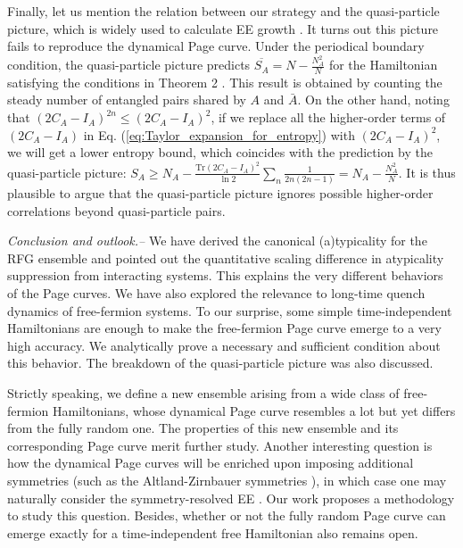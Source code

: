 \documentclass[twocolumn,english,prl,aps,superscriptaddress,amsmath,amssymb,floatfix]{revtex4-2}
\begin{document}
Finally, let us mention the relation between our strategy
and the quasi-particle picture, which is widely 
used to calculate EE 
growth \citep{PhysRevLett.127.060404,Jurcevic2014,Castro2016_,Essler2016,Calabrese2005,Fagotti2008,Bertini2018,BertiniB2018_2}. 
It turns out this picture fails to 
reproduce the 
dynamical Page curve. Under the 
periodical boundary condition, the quasi-particle
picture predicts 
$\overline{S_{A}}=N-\frac{N_{A}^{2}}{N}$
for the Hamiltonian satisfying the conditions in Theorem 2 \cite{SM}. This result is obtained by counting the steady number of entangled pairs shared by $A$ and $\bar A$. 
On the other hand, noting that $(2C_{A}-I_{A})^{2n}\leq(2C_{A}-I_{A})^{2}$,
if we replace all the higher-order terms of $(2C_{A}-I_{A})$ in Eq. (\ref{eq:Taylor_expansion_for_entropy})
with $(2C_{A}-I_{A})^{2}$, we will get a lower entropy 
bound, which coincides with the prediction 
by the quasi-particle picture: $S_{A}\geq N_{A}-\frac{\mathrm{Tr}(2C_{A}-I_{A})^{2}}{\ln2}\sum_{n}\frac{1}{2n(2n-1)}=N_{A}-\frac{N_{A}^{2}}{N}$.
It is thus plausible 
to argue that the quasi-particle picture ignores
possible higher-order correlations beyond 
quasi-particle pairs. 


\emph{Conclusion and outlook.--}
We have derived the canonical
(a)typicality for the RFG ensemble 
and pointed out the quantitative 
scaling difference in atypicality suppression 
from interacting systems. This 
explains the very different behaviors of the Page curves. 
We have also explored the relevance to long-time quench dynamics of 
free-fermion systems. 
To our surprise, some simple time-independent
Hamiltonians are enough to 
make the free-fermion Page curve 
emerge to a very high accuracy. 
We analytically prove a necessary and sufficient condition about this behavior. The breakdown %
of the quasi-particle picture was also discussed.

Strictly speaking, we define a new %
ensemble arising from %
a wide class of free-fermion Hamiltonians, whose dynamical Page curve resembles a lot but yet differs from %
the fully random one. %
The properties of this new ensemble and its corresponding Page curve %
merit further study. Another interesting question is how the %
dynamical Page curves will be enriched upon imposing %
additional symmetries (such as the Altland-Zirnbauer symmetries \cite{Altland1997}), in which case one may naturally consider %
the symmetry-resolved EE %
\citep{PhysRevD.106.046015,Lau2022}. %
Our work proposes a methodology to study this question. Besides, whether
or not the fully random Page curve can emerge exactly for a time-independent free Hamiltonian %
also remains open.
\end{document}
